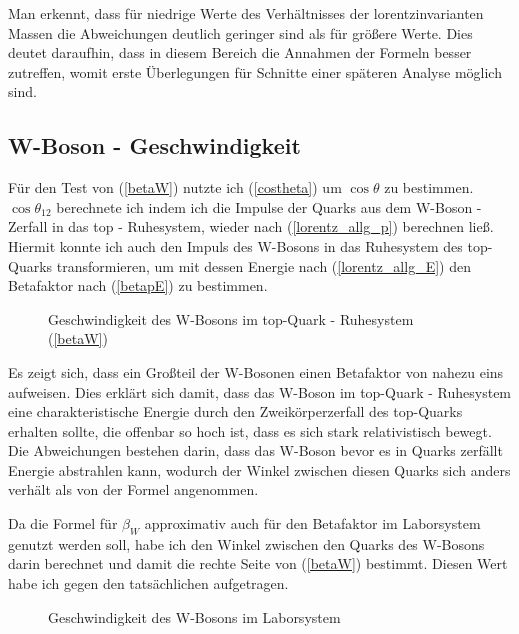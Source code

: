 \documentclass[
a4paper,                                %
twoside,                                %
BCOR1.4cm,                      %
ngerman,                                %
10pt,                           %
headings=normal,                %
headsepline,                    %
clearplainpage, %
final,                                  %
div=14,
parskip=full
]{scrbook}
\begin{document}
Man erkennt, dass f\"ur niedrige Werte des Verh\"altnisses der lorentzinvarianten Massen die Abweichungen deutlich geringer sind als f\"ur gr\"o\ss ere Werte. Dies deutet daraufhin, dass in diesem Bereich die Annahmen der Formeln besser zutreffen, womit erste \"Uberlegungen f\"ur Schnitte einer sp\"ateren Analyse m\"oglich sind.

\newpage

\subsection{W-Boson - Geschwindigkeit}\label{betaWtest}

F\"ur den Test von (\ref{betaW}) nutzte ich (\ref{costheta}) um $ \cos \theta $ zu bestimmen. 
$ \cos \theta_{12} $ berechnete ich indem ich die Impulse der Quarks aus dem W-Boson - Zerfall in das top - Ruhesystem, wieder nach (\ref{lorentz_allg_p}) berechnen lie\ss. Hiermit konnte ich auch den Impuls des W-Bosons in das Ruhesystem des top-Quarks transformieren, um mit dessen Energie nach (\ref{lorentz_allg_E}) den Betafaktor nach (\ref{betapE}) zu bestimmen.

\begin{figure}[h]
    \caption{Geschwindigkeit des W-Bosons im top-Quark - Ruhesystem (\ref{betaW})}
\end{figure}

Es zeigt sich, dass ein Gro\ss teil der W-Bosonen einen Betafaktor von nahezu eins aufweisen. Dies erkl\"art sich damit, dass das W-Boson im top-Quark - Ruhesystem eine charakteristische Energie durch den Zweik\"orperzerfall des top-Quarks erhalten sollte, die offenbar so hoch ist, dass es sich stark relativistisch bewegt. 
Die Abweichungen bestehen darin, dass das W-Boson bevor es in Quarks zerf\"allt Energie abstrahlen kann, wodurch der Winkel zwischen diesen Quarks sich anders verh\"alt als von der Formel angenommen.

Da die Formel f\"ur $ \beta_{W} $ approximativ auch f\"ur den Betafaktor im Laborsystem genutzt werden soll, habe ich den Winkel zwischen den Quarks des W-Bosons darin berechnet und damit die rechte Seite von (\ref{betaW}) bestimmt. Diesen Wert habe ich gegen den tats\"achlichen aufgetragen.

\begin{figure}[h]
    \caption{Geschwindigkeit des W-Bosons im Laborsystem}
    \label{betaWlabhist}
\end{figure}
\end{document}
